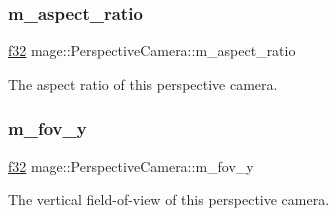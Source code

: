 \subsubsection{\texorpdfstring{m\+\_\+aspect\+\_\+ratio}{m\_aspect\_ratio}}
{\footnotesize\ttfamily \hyperlink{namespacemage_a6a44ad388483959dc4dff9f2aef91431}{f32} mage\+::\+Perspective\+Camera\+::m\+\_\+aspect\+\_\+ratio\hspace{0.3cm}{\ttfamily [private]}}

The aspect ratio of this perspective camera. \hypertarget{classmage_1_1_perspective_camera_a1cc94ee3bba3ef27f6d45c195f70173a}{}\label{classmage_1_1_perspective_camera_a1cc94ee3bba3ef27f6d45c195f70173a} 
\subsubsection{\texorpdfstring{m\+\_\+fov\+\_\+y}{m\_fov\_y}}
{\footnotesize\ttfamily \hyperlink{namespacemage_a6a44ad388483959dc4dff9f2aef91431}{f32} mage\+::\+Perspective\+Camera\+::m\+\_\+fov\+\_\+y\hspace{0.3cm}{\ttfamily [private]}}

The vertical field-\/of-\/view of this perspective camera. 